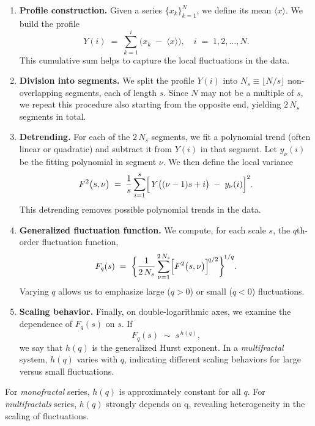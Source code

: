 \documentclass[11pt]{extarticle}
\begin{document}
\begin{enumerate}
    \item \textbf{Profile construction.} Given a series $\{x_k\}_{k=1}^N$, we define its mean $\langle x \rangle$. We build the profile
    \[
        Y(i) \;=\; \sum_{k=1}^{i} \bigl(x_k \;-\; \langle x \rangle\bigr),
        \quad i \;=\; 1,2,\dots,N.
    \]
    This cumulative sum helps to capture the local fluctuations in the data.

    \item \textbf{Division into segments.} We split the profile $Y(i)$ into $N_s \equiv \lfloor N/s \rfloor$ non-overlapping segments, each of length $s$. Since $N$ may not be a multiple of $s$, we repeat this procedure also starting from the opposite end, yielding $2\,N_s$ segments in total.

    \item \textbf{Detrending.} For each of the $2\,N_s$ segments, we fit a polynomial trend (often linear or quadratic) and subtract it from $Y(i)$ in that segment. Let $y_\nu(i)$ be the fitting polynomial in segment $\nu$. We then define the local variance
    \[
        F^2\bigl(s,\nu\bigr)
        \;=\;
        \frac{1}{s}
        \sum_{i=1}^s
        \Bigl[\,Y\bigl((\nu-1)s + i\bigr)\;-\;y_\nu(i)\Bigr]^2.
    \]
    This detrending removes possible polynomial trends in the data.

    \item \textbf{Generalized fluctuation function.} We compute, for each scale $s$, the $q$th-order fluctuation function,
    \[
        F_q(s)
        \;=\;
        \biggl\{
          \frac{1}{2\,N_s}
          \sum_{\nu=1}^{2\,N_s}
          \Bigl[
            F^2\bigl(s,\nu\bigr)
          \Bigr]^{\!q/2}
        \biggr\}^{\!1/q}.
    \]
    Varying $q$ allows us to emphasize large ($q>0$) or small ($q<0$) fluctuations.

    \item \textbf{Scaling behavior.} Finally, on double-logarithmic axes, we examine the dependence of $F_q(s)$ on $s$. If
    \[
        F_q(s) \;\sim\; s^{\,h(q)},
    \]
    we say that $h(q)$ is the generalized Hurst exponent. In a \emph{multifractal} system, $h(q)$ varies with $q$, indicating different scaling behaviors for large versus small fluctuations.
\end{enumerate}

For \emph{monofractal} series, $h(q)$ is approximately constant for all $q$.
For \emph{multifractals} series, $h(q)$ strongly depends on q, revealing heterogeneity in the scaling of fluctuations.
\end{document}
